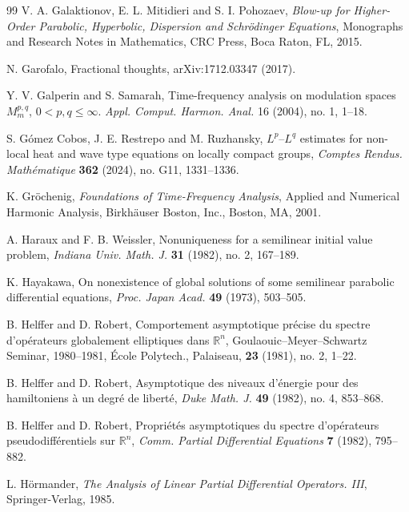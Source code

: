 \documentclass[12pt, reqno]{amsart}
\theoremstyle{definition}
\theoremstyle{remark}
\numberwithin{equation}{section}
\begin{document}
\begin{thebibliography}{99}
V. A. Galaktionov, E. L. Mitidieri and S. I. Pohozaev,
\emph{Blow-up for Higher-Order Parabolic, Hyperbolic, Dispersion and Schr\"odinger Equations},
Monographs and Research Notes in Mathematics, CRC Press, Boca Raton, FL, 2015.

N. Garofalo,
Fractional thoughts,
arXiv:1712.03347 (2017).


 Y. V. Galperin and S. Samarah,  Time-frequency analysis on modulation
spaces $M_m^{p, q}$, $0 < p, q \leq \infty$. \emph{Appl. Comput. Harmon. Anal.} 16 (2004), no. 1,
1–18.

S. G\'omez Cobos, J. E. Restrepo and M. Ruzhansky,
$L^p$--$L^q$ estimates for non-local heat and wave type equations on locally compact groups,
\emph{Comptes Rendus. Math\'ematique} \textbf{362} (2024), no. G11, 1331--1336.

K. Gr{\"o}chenig,
\emph{Foundations of Time-Frequency Analysis},
Applied and Numerical Harmonic Analysis, Birkh\"auser Boston, Inc., Boston, MA, 2001.

A. Haraux and F. B. Weissler,
Nonuniqueness for a semilinear initial value problem,
\emph{Indiana Univ. Math. J.} \textbf{31} (1982), no. 2, 167--189.

K. Hayakawa,
On nonexistence of global solutions of some semilinear parabolic differential equations,
\emph{Proc. Japan Acad.} \textbf{49} (1973), 503--505.

B. Helffer and D. Robert,
Comportement asymptotique pr\'ecise du spectre d'op\'erateurs globalement elliptiques dans $\mathbb{R}^n$,
Goulaouic--Meyer--Schwartz Seminar, 1980--1981, \'Ecole Polytech., Palaiseau, \textbf{23} (1981), no. 2, 1--22.

B. Helffer and D. Robert,
Asymptotique des niveaux d'\'energie pour des hamiltoniens \`a un degr\'e de libert\'e,
\emph{Duke Math. J.} \textbf{49} (1982), no. 4, 853--868.

B. Helffer and D. Robert,
Propri\'et\'es asymptotiques du spectre d'op\'erateurs pseudodiff\'erentiels sur $\mathbb{R}^n$,
\emph{Comm. Partial Differential Equations} \textbf{7} (1982), 795--882.

L. H{\"o}rmander,
\emph{The Analysis of Linear Partial Differential Operators. III},
Springer-Verlag, 1985.


\end{thebibliography}
\end{document}
